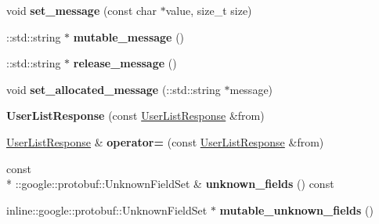\begin{DoxyCompactItemize}
\item 
\hypertarget{classSimpleChat_1_1UserListResponse_ae44dc970456d556259264ebdbe9f2727}{void {\bfseries set\-\_\-message} (const char $\ast$value, size\-\_\-t size)}\label{classSimpleChat_1_1UserListResponse_ae44dc970456d556259264ebdbe9f2727}

\item 
\hypertarget{classSimpleChat_1_1UserListResponse_a520f406aea09996614aa68d87b3d91fc}{\-::std\-::string $\ast$ {\bfseries mutable\-\_\-message} ()}\label{classSimpleChat_1_1UserListResponse_a520f406aea09996614aa68d87b3d91fc}

\item 
\hypertarget{classSimpleChat_1_1UserListResponse_a3ca109406363b8acb93fc2619e90efb4}{\-::std\-::string $\ast$ {\bfseries release\-\_\-message} ()}\label{classSimpleChat_1_1UserListResponse_a3ca109406363b8acb93fc2619e90efb4}

\item 
\hypertarget{classSimpleChat_1_1UserListResponse_aa30eaf3be3fdf6dc90d8c5afaf943caf}{void {\bfseries set\-\_\-allocated\-\_\-message} (\-::std\-::string $\ast$message)}\label{classSimpleChat_1_1UserListResponse_aa30eaf3be3fdf6dc90d8c5afaf943caf}

\item 
\hypertarget{classSimpleChat_1_1UserListResponse_a16b237391d6a195da652a12d0a3dd81d}{{\bfseries User\-List\-Response} (const \hyperlink{classSimpleChat_1_1UserListResponse}{User\-List\-Response} \&from)}\label{classSimpleChat_1_1UserListResponse_a16b237391d6a195da652a12d0a3dd81d}

\item 
\hypertarget{classSimpleChat_1_1UserListResponse_a777dbe9b9136d3c4e661fd4dd4f977cd}{\hyperlink{classSimpleChat_1_1UserListResponse}{User\-List\-Response} \& {\bfseries operator=} (const \hyperlink{classSimpleChat_1_1UserListResponse}{User\-List\-Response} \&from)}\label{classSimpleChat_1_1UserListResponse_a777dbe9b9136d3c4e661fd4dd4f977cd}

\item 
\hypertarget{classSimpleChat_1_1UserListResponse_ab4b494abc5d4878a87c8103f0ad44728}{const \\*
\-::google\-::protobuf\-::\-Unknown\-Field\-Set \& {\bfseries unknown\-\_\-fields} () const }\label{classSimpleChat_1_1UserListResponse_ab4b494abc5d4878a87c8103f0ad44728}

\item 
\hypertarget{classSimpleChat_1_1UserListResponse_a506a12daf50705b94c187981afa036e6}{inline\-::google\-::protobuf\-::\-Unknown\-Field\-Set $\ast$ {\bfseries mutable\-\_\-unknown\-\_\-fields} ()}\label{classSimpleChat_1_1UserListResponse_a506a12daf50705b94c187981afa036e6}


\end{DoxyCompactItemize}

